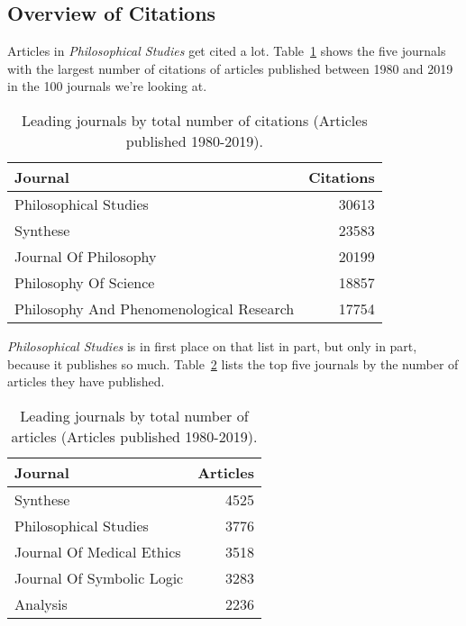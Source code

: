 \documentclass[
  11pt,
  letterpaper,
  DIV=11,
  numbers=noendperiod,
  twoside]{scrartcl}
\begin{document}
\subsection{Overview of Citations}\label{sec-citations-overview}

Articles in \emph{Philosophical Studies} get cited a lot.
Table~\ref{tbl-all-cites} shows the five journals with the largest
number of citations of articles published between 1980 and 2019 in the
100 journals we're looking at.

\begin{longtable}[]{@{}lr@{}}

\caption{\label{tbl-all-cites}Leading journals by total number of
citations (Articles published 1980-2019).}

\tabularnewline

\toprule\noalign{}
Journal & Citations \\
\midrule\noalign{}
\endhead
\bottomrule\noalign{}
\endlastfoot
Philosophical Studies & 30613 \\
Synthese & 23583 \\
Journal Of Philosophy & 20199 \\
Philosophy Of Science & 18857 \\
Philosophy And Phenomenological Research & 17754 \\

\end{longtable}

\emph{Philosophical Studies} is in first place on that list in part, but
only in part, because it publishes so much. Table~\ref{tbl-all-articles}
lists the top five journals by the number of articles they have
published.

\begin{longtable}[]{@{}lr@{}}

\caption{\label{tbl-all-articles}Leading journals by total number of
articles (Articles published 1980-2019).}

\tabularnewline

\toprule\noalign{}
Journal & Articles \\
\midrule\noalign{}
\endhead
\bottomrule\noalign{}
\endlastfoot
Synthese & 4525 \\
Philosophical Studies & 3776 \\
Journal Of Medical Ethics & 3518 \\
Journal Of Symbolic Logic & 3283 \\
Analysis & 2236 \\

\end{longtable}
\end{document}
